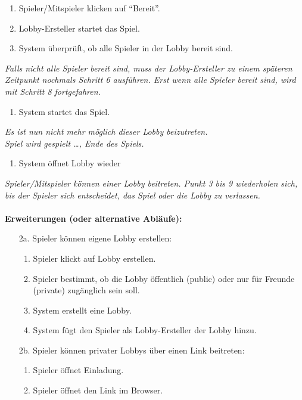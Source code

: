 \documentclass[11pt,ngerman]{article}
\newcommand{\quotes}[1]{``#1''}
\begin{document}
\begin{tcolorbox}
\begin{enumerate}
    		\item Spieler/Mitspieler klicken auf \quotes{Bereit}.
    		\item Lobby-Ersteller startet das Spiel.
    		\item System überprüft, ob alle Spieler in der \Gls{Lobby} bereit sind.
    	\end{enumerate}
    	\textit{Falls nicht alle Spieler bereit sind, muss der Lobby-Ersteller zu einem späteren Zeitpunkt nochmals Schritt 6 ausführen. Erst wenn alle Spieler bereit sind, wird mit Schritt 8 fortgefahren.}
    	\begin{enumerate}[resume]
    		\item System startet das Spiel.
    	\end{enumerate}
    	\textit{Es ist nun nicht mehr möglich dieser \Gls{Lobby} beizutreten.} \\
    	\textit{Spiel wird gespielt …, Ende des Spiels.}
    	\begin{enumerate}[resume]
    		\item System öffnet \Gls{Lobby} wieder
    	\end{enumerate}
    	\textit{Spieler/Mitspieler können einer \Gls{Lobby} beitreten. Punkt 3 bis 9 wiederholen sich, bis der Spieler sich entscheidet, das Spiel oder die \Gls{Lobby} zu verlassen.} \\
    	\\ \textbf{Erweiterungen (oder alternative Abläufe):}
    	\begin{itemize}
    		\item[2a.] Spieler können eigene \Gls{Lobby} erstellen:
    		\begin{enumerate}
    			\item Spieler klickt auf \Gls{Lobby} erstellen.
    			\item Spieler bestimmt, ob die \Gls{Lobby} öffentlich (public) oder nur für Freunde (private) zugänglich sein soll.
    			\item System erstellt eine \Gls{Lobby}.
    			\item System fügt den Spieler als Lobby-Ersteller der \Gls{Lobby} hinzu.
    		\end{enumerate}
    		\item[2b.] Spieler können privater \Glspl{Lobby} über einen Link beitreten:
    		\begin{enumerate}
    			\item Spieler öffnet Einladung.
    			\item Spieler öffnet den Link im Browser.

\end{enumerate}
\end{itemize}
\end{tcolorbox}
\end{document}
